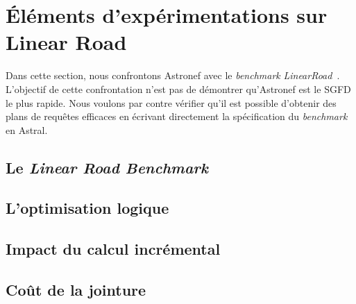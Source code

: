\section{Éléments d'expérimentations sur Linear Road}\label{sec:valid:perfs:flux}
Dans cette section, nous confrontons Astronef avec le \textit{benchmark} \textit{LinearRoad}~\cite{Arasu:lrb}. L'objectif de cette confrontation n'est pas de démontrer qu'Astronef est le SGFD le plus rapide. Nous voulons par contre vérifier qu'il est possible d'obtenir des plans de requêtes efficaces en écrivant directement la spécification du \textit{benchmark} en Astral.

\subsection{Le \textit{Linear Road Benchmark}}
\subsection{L'optimisation logique}
\subsection{Impact du calcul incrémental}
\subsection{Coût de la jointure}
